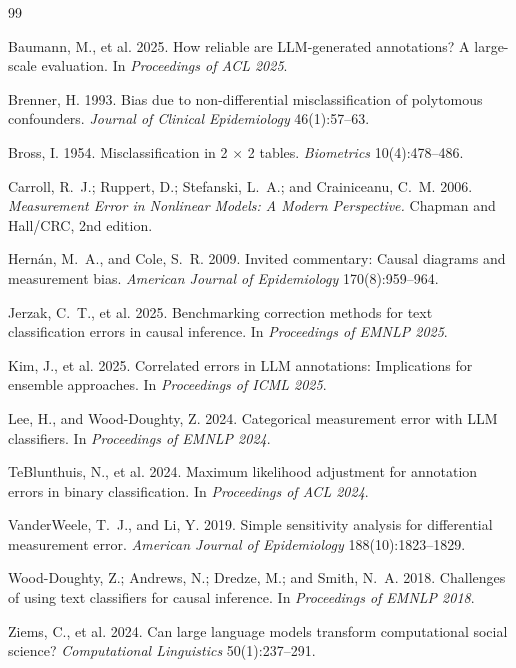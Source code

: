 \documentclass[11pt,letterpaper]{article}
\begin{document}

\begin{thebibliography}{99}

Baumann, M., et al. 2025.
How reliable are LLM-generated annotations? A large-scale evaluation.
In \emph{Proceedings of ACL 2025}.

Brenner, H. 1993.
Bias due to non-differential misclassification of polytomous confounders.
\emph{Journal of Clinical Epidemiology} 46(1):57--63.

Bross, I. 1954.
Misclassification in 2 $\times$ 2 tables.
\emph{Biometrics} 10(4):478--486.

Carroll, R.~J.; Ruppert, D.; Stefanski, L.~A.; and Crainiceanu, C.~M. 2006.
\emph{Measurement Error in Nonlinear Models: A Modern Perspective.}
Chapman and Hall/CRC, 2nd edition.

Hern{\'a}n, M.~A., and Cole, S.~R. 2009.
Invited commentary: Causal diagrams and measurement bias.
\emph{American Journal of Epidemiology} 170(8):959--964.

Jerzak, C.~T., et al. 2025.
Benchmarking correction methods for text classification errors in causal inference.
In \emph{Proceedings of EMNLP 2025}.

Kim, J., et al. 2025.
Correlated errors in LLM annotations: Implications for ensemble approaches.
In \emph{Proceedings of ICML 2025}.

Lee, H., and Wood-Doughty, Z. 2024.
Categorical measurement error with LLM classifiers.
In \emph{Proceedings of EMNLP 2024}.

TeBlunthuis, N., et al. 2024.
Maximum likelihood adjustment for annotation errors in binary classification.
In \emph{Proceedings of ACL 2024}.

VanderWeele, T.~J., and Li, Y. 2019.
Simple sensitivity analysis for differential measurement error.
\emph{American Journal of Epidemiology} 188(10):1823--1829.

Wood-Doughty, Z.; Andrews, N.; Dredze, M.; and Smith, N.~A. 2018.
Challenges of using text classifiers for causal inference.
In \emph{Proceedings of EMNLP 2018}.

Ziems, C., et al. 2024.
Can large language models transform computational social science?
\emph{Computational Linguistics} 50(1):237--291.

\end{thebibliography}
\end{document}
